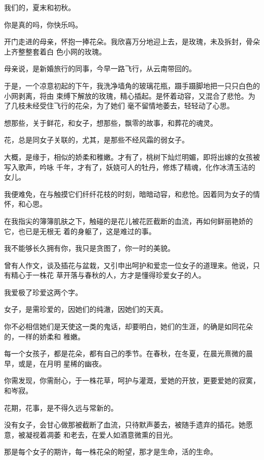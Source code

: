 \documentclass[12pt,a4paper]{article}
\def\blankrev{\vspace{1ex}}									%
\begin{document}
		我们的，夏末和初秋。

		你是真的吗，你快乐吗。

	\endwriting



		开门走进的母亲，怀抱一捧花朵。我欣喜万分地迎上去，是玫瑰，未及拆封，骨朵上齐整整套着白
	色小网的玫瑰。

		母亲说，是新婚旅行的同事，今早一路飞行，从云南带回的。


		于是，一个凉意初起的下午，我洗净墙角的玻璃花瓶，蹑手蹑脚地把一只只白色的小网剥离，将由
	束缚下解放的玫瑰，精心插起。是怀着动容，又混合了悲怆。为了几枝未经受住飞行的花朵，为了她们
	毫不留情地萎去，轻轻动了心思。

		想那些，关于鲜花，和女子，想那些，飘零的故事，和葬花的魂灵。

		花，总是同女子关联的，尤其，是那些不经风霜的弱女子。

		大概，是缘于，相似的娇柔和稚嫩。才有了，桃树下灿烂明媚，即将出嫁的女孩被写入歌声，吟咏
	千年，才有了，妖娆可人的牡丹，修炼了精魂，化作冰清玉洁的女儿。

		我便难免，在与触摸它们纤纤花枝的时刻，暗暗动容，和悲怆。因着同为女子的情怀，和心思。

		在我指尖的簿簿肌肤之下，触碰的是花儿被花匠截断的血流，再如何鲜丽艳娇的它，也已是无根无
	着的身躯了，这是难过的事。

		我不能够长久拥有你，我只是贪图了，你一时的美貌。


		\blankrev
		曾有人作文，谈及插花与盆栽，又引申出呵护和爱恋一位女子的道理来。他说，只有精心于一株花
	草开落与春秋的人，方才是懂得珍爱女子的人。

		我爱极了珍爱这两个字。

		女子，是需珍爱的，因她们的纯澈，因她们的天真。

		你不必相信她们是天使这一类的鬼话，却要明白，她们的生涯，的确是如同花朵的，一样的娇柔和
	稚嫩。

		每一个女孩子，都是花朵，都有自己的季节。在春秋，在冬夏，在晨光熹微的晨早，或是，在月明
	星稀的幽夜。

		你需发现，你需耐心，于一株花草，呵护与灌溉，爱她的开放，更要爱她的寂寞，和岑寂。

		花期，花事，是不得久远与常新的。

		没有女子，会甘心做那被截断了血流，只待默声萎去，被随手遗弃的插花。她愿意，被凝视着凋萎
	和老去，在爱人如酒意微熏的目光。

		那是每个女子的期许，每一株花朵的盼望，那才是生命，活的生命。
\end{document}
